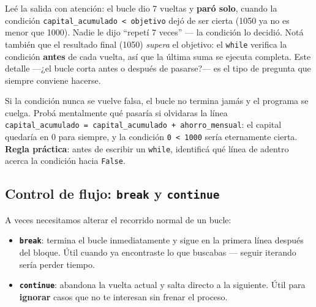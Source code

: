 \documentclass[
  spanish,
  letterpaper,
  DIV=11,
  numbers=noendperiod]{scrreprt}
\providecommand{\tightlist}{%
  \setlength{\itemsep}{0pt}\setlength{\parskip}{0pt}}
\begin{document}
Leé la salida con atención: el bucle dio 7 vueltas y \textbf{paró solo},
cuando la condición \texttt{capital\_acumulado\ \textless{}\ objetivo}
dejó de ser cierta (1050 ya no es menor que 1000). Nadie le dijo
``repetí 7 veces'' --- la condición lo decidió. Notá también que el
resultado final (1050) \emph{supera} el objetivo: el \texttt{while}
verifica la condición \textbf{antes} de cada vuelta, así que la última
suma se ejecuta completa. Este detalle ---¿el bucle corta antes o
después de pasarse?--- es el tipo de pregunta que siempre conviene
hacerse.

\begin{tcolorbox}[enhanced jigsaw, bottomrule=.15mm, colback=white, opacitybacktitle=0.6, arc=.35mm, toprule=.15mm, opacityback=0, breakable, titlerule=0mm, left=2mm, coltitle=black, colbacktitle=quarto-callout-warning-color!10!white, colframe=quarto-callout-warning-color-frame, leftrule=.75mm, toptitle=1mm, bottomtitle=1mm, title=\textcolor{quarto-callout-warning-color}{\faExclamationTriangle}\hspace{0.5em}{El bucle infinito: el error clásico del \texttt{while}}, rightrule=.15mm]

Si la condición nunca se vuelve falsa, el bucle no termina jamás y el
programa se cuelga. Probá mentalmente qué pasaría si olvidaras la línea
\texttt{capital\_acumulado\ =\ capital\_acumulado\ +\ ahorro\_mensual}:
el capital quedaría en 0 para siempre, y la condición
\texttt{0\ \textless{}\ 1000} sería eternamente cierta. \textbf{Regla
práctica}: antes de escribir un \texttt{while}, identificá qué línea de
adentro acerca la condición hacia \texttt{False}.

\end{tcolorbox}

\subsection{\texorpdfstring{Control de flujo: \texttt{break} y
\texttt{continue}}{Control de flujo: break y continue}}\label{control-de-flujo-break-y-continue}

A veces necesitamos alterar el recorrido normal de un bucle:

\begin{itemize}
\tightlist
\item
  \textbf{\texttt{break}}: termina el bucle inmediatamente y sigue en la
  primera línea después del bloque. Útil cuando ya encontraste lo que
  buscabas --- seguir iterando sería perder tiempo.
\item
  \textbf{\texttt{continue}}: abandona la vuelta actual y salta directo
  a la siguiente. Útil para \textbf{ignorar} casos que no te interesan
  sin frenar el proceso.
\end{itemize}
\end{document}
